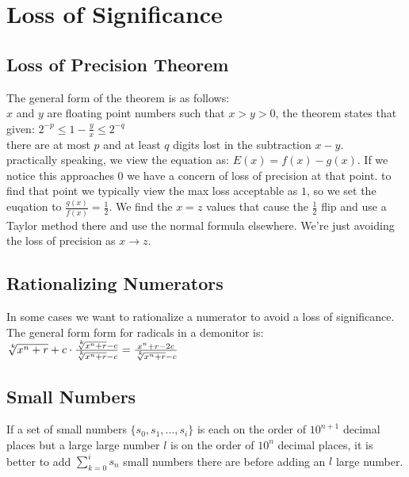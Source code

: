 \section{Loss of Significance}


\subsection*{Loss of Precision Theorem}
The general form of the theorem is as follows:\\
$x$ and $y$ are floating point numbers such that $x > y > 0$,
the theorem states that given:
$ 2^{-p} \leq 1 - \frac{y}{x} \leq 2^{-q} $\\
there are at most $p$ and at least $q$ digits lost in the subtraction $x-y$.\\

practically speaking, we view the equation as: $E(x) = f(x) - g(x)$. If
we notice this approaches $0$ we have a concern of loss of precision at that point.
to find that point we typically view the max loss acceptable as $1$, so we set
the euqation to $\frac{g(x)}{f(x)} = \frac{1}{2}$. We find the $x = z$ values that cause
the $\frac{1}{2}$ flip and use a Taylor method there and use the normal formula elsewhere.
We're just avoiding the loss of precision as $x \rightarrow z$.

\subsection*{Rationalizing Numerators}
In some cases we want to rationalize a numerator to avoid a loss of significance.
The general form form for radicals in a demonitor is:\\
$\sqrt[\leftroot{-2}\uproot{2}k]{x^n + r} + c  \cdot \frac{\sqrt[\leftroot{-2}\uproot{2}k]{x^n + r} - c}{\sqrt[\leftroot{-2}\uproot{2}k]{x^n + r} - c}   =  \frac{x^n + r -2c}{\sqrt[\leftroot{-2}\uproot{2}k]{x^n + r} - c}$\\

\subsection*{Small Numbers}
If a set of small numbers $\{s_0, s_1, ... , s_i\}$ is each on the order of $10^{n+1}$ decimal places but
a large large number $l$ is on the order of $10^{n}$ decimal places, it is better
to add $\sum_{k=0}^{i} s_n$ small numbers there are before
adding an $l$ large number.
